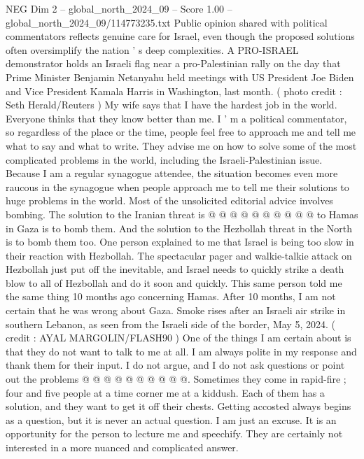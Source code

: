 \begin{textsample}{NEG Dim 2 – global\_north\_2024\_09 – Score 1.00 – global\_north\_2024\_09/114773235.txt}  \label{ex:f2_neg_034}
Public opinion shared with political commentators reflects genuine care for Israel, even though the proposed solutions often oversimplify the nation ' s deep complexities.
A PRO-ISRAEL demonstrator holds an Israeli flag near a pro-Palestinian rally on the day that Prime Minister Benjamin Netanyahu held meetings with US President Joe Biden and Vice President Kamala Harris in Washington, last month. ( photo credit : Seth Herald/Reuters ) My wife says that I have the hardest job in the world.
Everyone thinks that they know better than me.
I ' m a political commentator, so regardless of the place or the time, people feel free to approach me and tell me what to say and what to write.
They advise me on how to solve some of the most complicated problems in the world, including the Israeli-Palestinian issue.
Because I am a regular synagogue attendee, the situation becomes even more raucous in the synagogue when people approach me to tell me their solutions to huge problems in the world.
Most of the unsolicited editorial advice involves bombing.
The solution to the Iranian threat is @ @ @ @ @ @ @ @ @ @ to Hamas in Gaza is to bomb them.
And the solution to the Hezbollah threat in the North is to bomb them too.
One person explained to me that Israel is being too slow in their reaction with Hezbollah.
The spectacular pager and walkie-talkie attack on Hezbollah just put off the inevitable, and Israel needs to quickly strike a death blow to all of Hezbollah and do it soon and quickly.
This same person told me the same thing 10 months ago concerning Hamas.
After 10 months, I am not certain that he was wrong about Gaza.
Smoke rises after an Israeli air strike in southern Lebanon, as seen from the Israeli side of the border, May 5, 2024. ( credit : AYAL MARGOLIN/FLASH90 ) One of the things I am certain about is that they do not want to talk to me at all.
I am always polite in my response and thank them for their input.
I do not argue, and I do not ask questions or point out the problems @ @ @ @ @ @ @ @ @ @.
Sometimes they come in rapid-fire ; four and five people at a time corner me at a kiddush.
Each of them has a solution, and they want to get it off their chests.
Getting accosted always begins as a question, but it is never an actual question.
I am just an excuse.
It is an opportunity for the person to lecture me and speechify.
They are certainly not interested in a more nuanced and complicated answer.

\end{textsample}

